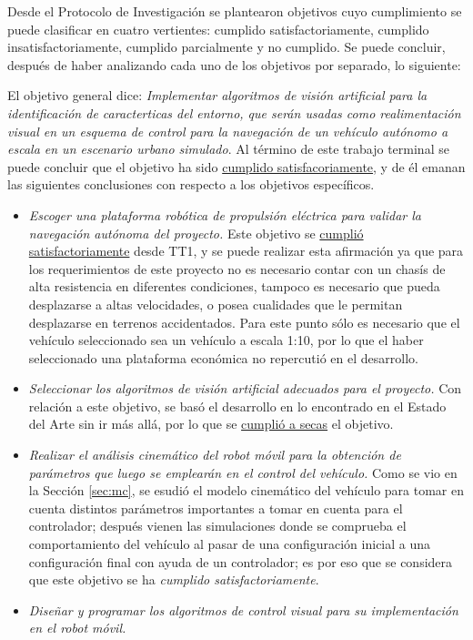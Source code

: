 Desde el Protocolo de Investigación se plantearon objetivos cuyo cumplimiento se puede clasificar en cuatro vertientes: cumplido satisfactoriamente, cumplido insatisfactoriamente, cumplido parcialmente y no cumplido. Se puede concluir, después de haber analizando cada uno de los objetivos por separado, lo siguiente:
\par El objetivo general dice: {\it Implementar algoritmos de visión artificial para la identificación de caracterticas del entorno, que serán usadas como realimentación visual en un esquema de control para la navegación de un vehículo autónomo a escala en un escenario urbano simulado}. Al término de este trabajo terminal se puede concluir que el objetivo ha sido \underline{cumplido satisfacoriamente}, y de él emanan las siguientes conclusiones con respecto a los objetivos específicos.
\begin{itemize}
	\item {\it Escoger una plataforma robótica de propulsión eléctrica para validar la navegación autónoma del proyecto.} Este objetivo se \underline{cumplió satisfactoriamente} desde TT1, y se puede realizar esta afirmación ya que para los requerimientos de este proyecto no es necesario contar con un chasís de alta resistencia en diferentes condiciones, tampoco es necesario que pueda desplazarse a altas velocidades, o posea cualidades que le permitan desplazarse en terrenos accidentados. Para este punto sólo es necesario que el vehículo seleccionado sea un vehículo a escala 1:10, por lo que el haber seleccionado una plataforma económica no repercutió en el desarrollo.
	\item {\it Seleccionar los algoritmos de visión artificial adecuados para el proyecto.} Con relación a este objetivo, se basó el desarrollo en lo encontrado en el Estado del Arte sin ir más allá, por lo que se \underline{cumplió a secas} el objetivo.
	\item {\it Realizar el análisis cinemático del robot móvil para la obtención de parámetros que luego se emplearán en el control del vehículo.} Como se vio en la Sección \ref{sec:mc}, se esudió el modelo cinemático del vehículo para tomar en cuenta distintos parámetros importantes a tomar en cuenta para el controlador; después vienen las simulaciones donde se comprueba el comportamiento del vehículo al pasar de una configuración inicial a una configuración final con ayuda de un controlador; es por eso que se considera que este objetivo se ha {\it cumplido satisfactoriamente}.
	\item {\it Diseñar y programar los algoritmos de control visual para su implementación en el robot móvil.}

\end{itemize}
